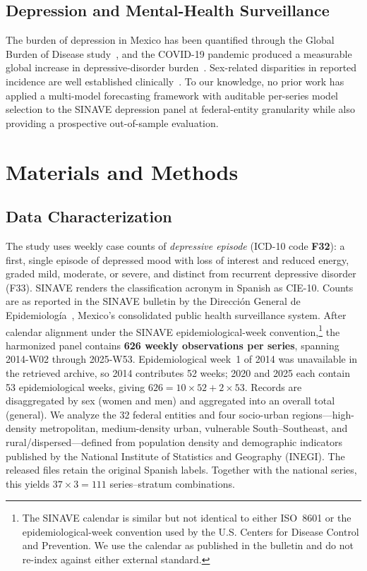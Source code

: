\documentclass[runningheads]{llncs}
\begin{document}
\subsection{Depression and Mental-Health Surveillance}

The burden of depression in Mexico has been quantified through the
Global Burden of Disease study~\cite{garciapacheco2024}, and the
COVID-19 pandemic produced a measurable global increase in
depressive-disorder burden~\cite{santomauro2021}. Sex-related
disparities in reported incidence are well established
clinically~\cite{albert2015}. To our knowledge, no prior work has
applied a multi-model forecasting framework with auditable per-series
model selection to the SINAVE depression panel at federal-entity
granularity while also providing a prospective out-of-sample
evaluation.

\section{Materials and Methods}
\label{sec:method}

\subsection{Data Characterization}
\label{ssec:data}

The study uses weekly case counts of \emph{depressive episode}
(\mbox{ICD-10} code \textbf{F32}): a first, single episode of depressed
mood with loss of interest and reduced energy, graded mild, moderate, or
severe, and distinct from recurrent depressive disorder (F33). SINAVE
renders the classification acronym in Spanish as \mbox{CIE-10}.
Counts are as reported in the SINAVE bulletin
by the Direcci\'on General de
Epidemiolog\'ia~\cite{sinave2026}, Mexico's consolidated public health
surveillance system. After calendar alignment under the
SINAVE epidemiological-week convention,\footnote{The SINAVE calendar
is similar but not identical to either ISO~8601 or the
epidemiological-week convention used by the U.S. Centers for Disease
Control and Prevention. We use the calendar as published in the bulletin
and do not re-index against either external standard.} the harmonized panel
contains \textbf{626 weekly observations per series}, spanning
2014-W02 through 2025-W53. Epidemiological
week~1 of 2014 was unavailable in the retrieved archive, so 2014
contributes 52 weeks; 2020 and 2025 each contain 53 epidemiological
weeks, giving $626 = 10{\times}52 + 2{\times}53$. Records are
disaggregated by sex (women and men) and aggregated into an overall
total (general). We analyze the 32 federal entities and four socio-urban
regions---high-density metropolitan, medium-density urban, vulnerable
South--Southeast, and rural/dispersed---defined from population density
and demographic indicators published by the National Institute of
Statistics and Geography (INEGI). The released files retain the original
Spanish labels. Together with the national series, this yields
$37 \times 3 = 111$ series--stratum combinations.
\end{document}
